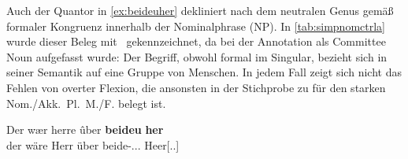 

Auch der Quantor in \cref{ex:beideuher} dekliniert nach dem neutralen Genus
gemäß formaler Kongruenz innerhalb der Nominalphrase (NP). In
\cref{tab:simpnomctrla} wurde dieser Beleg mit \SA\ gekennzeichnet, da
  bei der Annotation als Committee Noun
\autocite[211--213]{corbett2006} aufgefasst wurde: Der Begriff, obwohl formal
im Singular, bezieht sich in seiner Semantik auf eine Gruppe von Menschen. In
jedem Fall zeigt sich nicht das Fehlen von overter Flexion, die ansonsten in
der Stichprobe zu \citet{kc:B1} für den starken Nom./Akk.~Pl.~M./F. belegt ist.

\begin{exe}
\ex \label{ex:beideuher}
	\gll Der wær herre ûber \textbf{beideu} \textbf{her} \\
		der wäre Herr über beide-\Acc.\Pl.\NeutA.\St{} Heer[\Acc.\Pl.\NeutA] \\
	\begin{taggedline}{\parencites[\pno~31\rc, 3]{kc:B1}[zu][11272\psqq]{schroeder1895}} %
	\trans {}
	\end{taggedline}
\end{exe}

